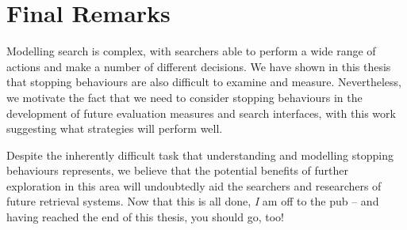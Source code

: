 \section{Final Remarks}\label{sec:conclusions:remarks}
Modelling search is complex, with searchers able to perform a wide range of actions and make a number of different decisions. We have shown in this thesis that stopping behaviours are also difficult to examine and measure. Nevertheless, we motivate the fact that we need to consider stopping behaviours in the development of future evaluation measures and search interfaces, with this work suggesting what strategies will perform well.

Despite the inherently difficult task that understanding and modelling stopping behaviours represents, we believe that the potential benefits of further exploration in this area will undoubtedly aid the searchers and researchers of future retrieval systems. Now that this is all done, \emph{I} am off to the pub -- and having reached the end of this thesis, you should go, too!